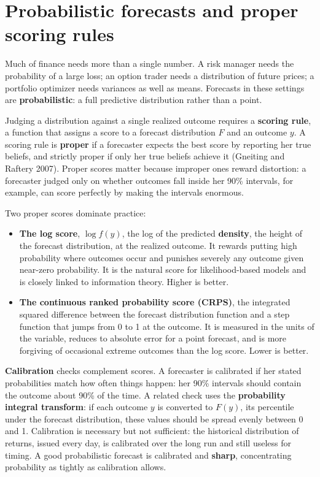 \section{Probabilistic forecasts and proper scoring rules}
\label{sec:05-scoring}

Much of finance needs more than a single number. A risk manager needs the probability of a large loss; an option trader needs a distribution of future prices; a portfolio optimizer needs variances as well as means. Forecasts in these settings are \textbf{probabilistic}: a full predictive distribution rather than a point.

Judging a distribution against a single realized outcome requires a \textbf{scoring rule}, a function that assigns a score to a forecast distribution $F$ and an outcome $y$. A scoring rule is \textbf{proper} if a forecaster expects the best score by reporting her true beliefs, and strictly proper if only her true beliefs achieve it (Gneiting and Raftery 2007). Proper scores matter because improper ones reward distortion: a forecaster judged only on whether outcomes fall inside her 90\% intervals, for example, can score perfectly by making the intervals enormous.

Two proper scores dominate practice:

\begin{itemize}
  \item \textbf{The log score}, $\log f(y)$, the log of the predicted \textbf{density}, the height of the forecast distribution, at the realized outcome. It rewards putting high probability where outcomes occur and punishes severely any outcome given near-zero probability. It is the natural score for likelihood-based models and is closely linked to information theory. Higher is better.
  \item \textbf{The continuous ranked probability score (CRPS)}, the integrated squared difference between the forecast distribution function and a step function that jumps from 0 to 1 at the outcome. It is measured in the units of the variable, reduces to absolute error for a point forecast, and is more forgiving of occasional extreme outcomes than the log score. Lower is better.
\end{itemize}

\textbf{Calibration} checks complement scores. A forecaster is calibrated if her stated probabilities match how often things happen: her 90\% intervals should contain the outcome about 90\% of the time. A related check uses the \textbf{probability integral transform}: if each outcome $y$ is converted to $F(y)$, its percentile under the forecast distribution, these values should be spread evenly between 0 and 1. Calibration is necessary but not sufficient: the historical distribution of returns, issued every day, is calibrated over the long run and still useless for timing. A good probabilistic forecast is calibrated and \textbf{sharp}, concentrating probability as tightly as calibration allows.

